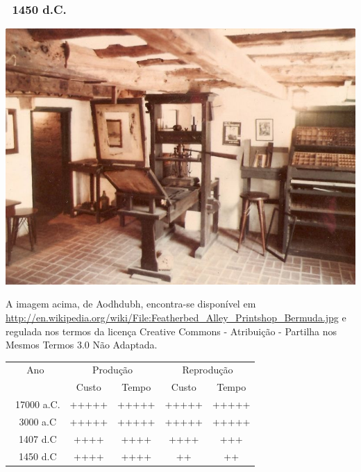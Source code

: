 \documentclass[]{beamer}
\begin{document}
\begin{frame}
    \frametitle{~1450 d.C.}
    \begin{center}
        \includegraphics[height=0.6\textheight]{pictures/featherbed_alley_printshop_bermuda.jpg}
    \end{center}

    \begin{tiny}
        A imagem acima, de Aodhdubh, encontra-se dispon\'{i}vel em \url{http://en.wikipedia.org/wiki/File:Featherbed_Alley_Printshop_Bermuda.jpg} e regulada nos termos da licen\c{c}a Creative Commons - Atribui\c{c}\~{a}o - Partilha nos Mesmos Termos 3.0 N\~{a}o Adaptada.
    \end{tiny}
\end{frame}

\begin{frame}[t]
    \begin{center}
        \begin{tabular}{|c|c|c|c|c|}
            \hline
            Ano & \multicolumn{2}{|c|}{Produ\c{c}\~{a}o} & \multicolumn{2}{|c|}{Reprodu\c{c}\~{a}o} \\ \cline{2-5}
            & Custo & Tempo & Custo & Tempo \\ \hline
            ~17000 a.C. & +++++ & +++++ & +++++ & +++++  \\ \hline
            ~3000 a.C & +++++ & +++++ & +++++ & +++++ \\ \hline
            ~1407 d.C & ++++ & ++++ & ++++ & +++ \\ \hline
            ~1450 d.C & ++++ & ++++ & ++ & ++ \\ \hline
        \end{tabular}
    \end{center}
\end{frame}
\end{document}
